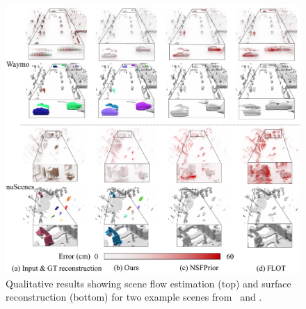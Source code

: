 \begin{figure}[t]
    \centering
    \includegraphics[width=1.0\columnwidth]{figs/figure/main_vis.pdf}
    \caption{Qualitative results showing scene flow estimation (top) and surface reconstruction (bottom) for two example scenes from \waymo~and \nuscenes.}
    \label{fig:qualitative_results}
\end{figure}
